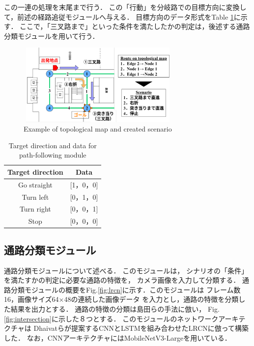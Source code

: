 \documentclass{sice-si}
\begin{document}
この一連の処理を末尾まで行う．
この「行動」を分岐路での目標方向に変換して，前述の経路追従モジュールへ与える．
目標方向のデータ形式をTable \ref{tab:target}に示す．
ここで，「三叉路まで」といった条件を満たしたかの判定は，後述する通路分類モジュールを用いて行う．
\begin{figure}[htbp]
    \centering
     \includegraphics[height=40mm,width=80mm]{./figs/topo2sce.pdf}
     \caption{Example of topological map and created scenario}\label{fig:topo2sce}
\end{figure}
\begin{table}[]
    \centering
    \caption{Target direction and data for path-following module}\label{tab:target}
    \begin{tabular}{|c|c|}
    \hline
    Target direction & Data        \\
    \hline
    Go straight   & {[}1，0，0{]} \\
    Turn left   & {[}0，1，0{]} \\
    Turn right   & {[}0，0，1{]} \\
    Stop   & {[}0，0，0{]}\\
    \hline
    \end{tabular}
    \end{table}

\subsection{通路分類モジュール}
通路分類モジュールについて述べる．
このモジュールは，
シナリオの「条件」を満たすかの判定に必要な通路の特徴を，
カメラ画像を入力して分類する．
通路分類モジュールの概要をFig.\ref{fig:lrcn}に示す．このモジュールは
フレーム数16，画像サイズ64×48の連続した画像データ
を入力とし，通路の特徴を分類した結果を出力とする．
通路の特徴の分類は島田らの手法\cite{shimada2020}に倣い，
Fig.\ref{fig:intersection}に示した８つとする．
このモジュールのネットワークアーキテクチャは
Dhaivatらが提案するCNNとLSTMを組み合わせたLRCN\cite{lrcn}に倣って構築した．
なお，CNNアーキテクチャにはMobileNetV3-Large\cite{v3}を用いている．
\end{document}

